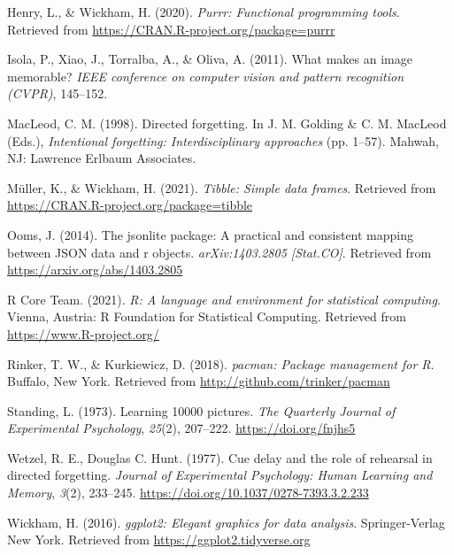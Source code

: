 \documentclass[
  man,floatsintext]{apa6}
\newlength{\cslhangindent}
\newlength{\cslentryspacingunit} %
\newenvironment{CSLReferences}[2] %
 {%
  \setlength{\parindent}{0pt}
  \ifodd #1
  \let\oldpar\par
  \def\par{\hangindent=\cslhangindent\oldpar}
  \fi
  \setlength{\parskip}{#2\cslentryspacingunit}
 }%
 {}
\begin{document}
\begin{CSLReferences}{1}{0}
\leavevmode{}%
Henry, L., \& Wickham, H. (2020). \emph{Purrr: Functional programming tools}. Retrieved from \url{https://CRAN.R-project.org/package=purrr}

\leavevmode{}%
Isola, P., Xiao, J., Torralba, A., \& Oliva, A. (2011). What makes an image memorable? \emph{IEEE conference on computer vision and pattern recognition (CVPR)}, 145--152.

\leavevmode{}%
MacLeod, C. M. (1998). Directed forgetting. In J. M. Golding \& C. M. MacLeod (Eds.), \emph{Intentional forgetting: {Interdisciplinary} approaches} (pp. 1--57). {Mahwah, NJ}: {Lawrence Erlbaum Associates}.

\leavevmode{}%
Müller, K., \& Wickham, H. (2021). \emph{Tibble: Simple data frames}. Retrieved from \url{https://CRAN.R-project.org/package=tibble}

\leavevmode{}%
Ooms, J. (2014). The jsonlite package: A practical and consistent mapping between JSON data and r objects. \emph{arXiv:1403.2805 {[}Stat.CO{]}}. Retrieved from \url{https://arxiv.org/abs/1403.2805}

\leavevmode{}%
R Core Team. (2021). \emph{R: A language and environment for statistical computing}. Vienna, Austria: R Foundation for Statistical Computing. Retrieved from \url{https://www.R-project.org/}

\leavevmode{}%
Rinker, T. W., \& Kurkiewicz, D. (2018). \emph{{pacman}: {P}ackage management for {R}}. Buffalo, New York. Retrieved from \url{http://github.com/trinker/pacman}

\leavevmode{}%
Standing, L. (1973). Learning 10000 pictures. \emph{The Quarterly Journal of Experimental Psychology}, \emph{25}(2), 207--222. \url{https://doi.org/fnjhs5}

\leavevmode{}%
Wetzel, R. E., Douglas C. Hunt. (1977). Cue delay and the role of rehearsal in directed forgetting. \emph{Journal of Experimental Psychology: Human Learning and Memory}, \emph{3}(2), 233--245. \url{https://doi.org/10.1037/0278-7393.3.2.233}

\leavevmode{}%
Wickham, H. (2016). \emph{ggplot2: Elegant graphics for data analysis}. Springer-Verlag New York. Retrieved from \url{https://ggplot2.tidyverse.org}


\end{CSLReferences}
\end{document}
